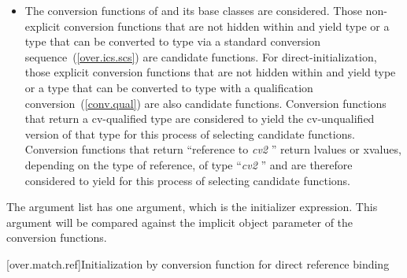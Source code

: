 \begin{itemize}
\item
The conversion functions of
and its base classes are considered.
Those non-explicit conversion functions that are not hidden
within
and yield type
or a type that can be converted to type
via a standard conversion sequence~(\ref{over.ics.scs})
are candidate functions.
For direct-initialization, those explicit conversion functions that are not
hidden within  and yield type  or a type that can be converted
to type  with a qualification conversion~(\ref{conv.qual}) are also
candidate functions.
Conversion functions that return a cv-qualified type
are considered to yield the cv-unqualified version of that type
for this process of selecting candidate functions.
Conversion functions that return ``reference to
\textit{cv2}
''
return
lvalues or xvalues, depending on the type of reference, of type
``\textit{cv2}
''
and are therefore considered to yield
for this
process of selecting candidate functions.
\end{itemize}

\pnum
The argument list has one argument, which is the initializer expression.
\enternote
This argument will be compared against
the implicit object parameter of the conversion functions.
\exitnote

[over.match.ref]{Initialization by conversion function for direct reference binding}%


